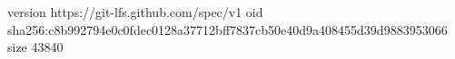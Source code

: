 version https://git-lfs.github.com/spec/v1
oid sha256:c8b992794e0c0fdec0128a37712bff7837cb50e40d9a408455d39d9883953066
size 43840
